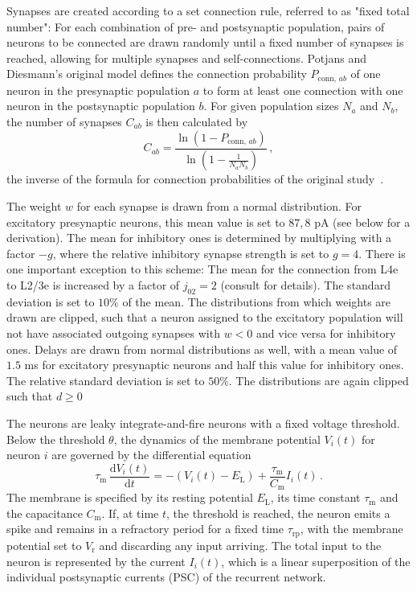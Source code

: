 Synapses are created according to a set connection rule, referred to as 
"fixed total number":
For each combination of pre- and postsynaptic population, pairs of neurons to be connected are drawn
randomly until a fixed number of synapses is reached, 
allowing for multiple synapses and self-connections. 
Potjans and Diesmann's original model defines the connection probability $P_{\text{conn}, \,ab}$ 
of one neuron in the presynaptic population $a$ to form at least one connection with one neuron in 
the postsynaptic population $b$. For given population sizes $N_a$ and $N_b$, the number of 
synapses $C_{ab}$ is then calculated by
\begin{equation}
    C_{ab} = \frac{\ln \left( 1 - P_{\text{conn}, \,ab} \right)}{\ln \left( 1 - \frac{1}{N_a N_b} \right)} \, ,
    \label{eq:synapse_numbers}
\end{equation}
the inverse of the formula for connection probabilities of the original study~\cite{potjans2014}.

The weight $w$ for each synapse is drawn from a normal distribution.
For excitatory presynaptic neurons, this mean value is set to $87,8$ pA (see below for 
a derivation). The mean for inhibitory ones is determined by multiplying 
with a factor $-g$, where the relative inhibitory synapse strength is set to 
$g = 4$. There is one important exception to this scheme:
The mean for the connection from L4e to L2/3e is increased by a factor of 
$j_{02} = 2$ (consult \cite{potjans2014} for details). 
The standard deviation is set to $10\%$ of the mean. 
The distributions from which weights are drawn are clipped, 
such that a neuron assigned to the excitatory 
population will not have associated outgoing synapses with $w < 0$ 
and vice versa for inhibitory ones. 
Delays are drawn from normal distributions as well, with a mean value 
of $1.5$ ms for excitatory presynaptic neurons and half this value for 
inhibitory ones. The relative standard deviation is set to $50 \%$. The distributions
are again clipped such that $d \ge 0$

The neurons are leaky integrate-and-fire neurons with a fixed voltage threshold. 
Below the threshold $\theta$, the dynamics of the membrane potential $V_i(t)$ 
for neuron $i$ are governed by the differential equation 
\begin{equation}
    \tau_\text{m} \,\frac{\text{d} V_i(t)}{\text{d} t} 
            = -(V_i(t) - E_\text{L}) + \frac{\tau_\text{m}}{C_\text{m}} I_i(t) \, .
    \label{eq:leaky_integrator}
\end{equation}
The membrane is specified by its resting potential $E_\text{L}$, 
its time constant $\tau_\text{m}$ and the capacitance $C_\text{m}$.
If, at time $t$, the threshold is reached, the neuron emits a spike and remains 
in a refractory period for a fixed time $\tau_\text{rp}$, with the membrane 
potential set to $V_\text{r}$ and discarding any input arriving. 
The total input to the neuron is represented by 
the current $I_i(t)$, which is a linear superposition of the individual 
postsynaptic currents (PSC) of the recurrent network.

